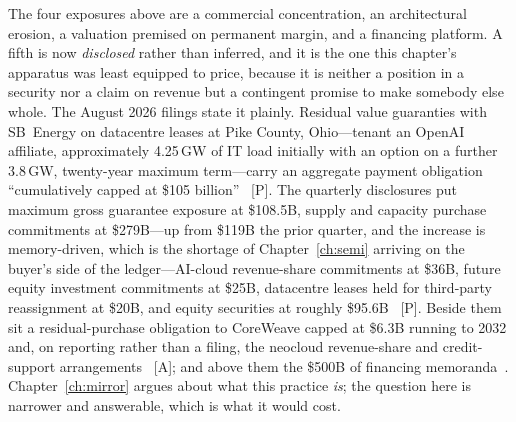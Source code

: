 The four exposures above are a commercial concentration, an architectural erosion, a valuation premised on permanent margin, and a financing platform. A fifth is now \emph{disclosed} rather than inferred, and it is the one this chapter's apparatus was least equipped to price, because it is neither a position in a security nor a claim on revenue but a contingent promise to make somebody else whole. The August 2026 filings state it plainly. Residual value guaranties with SB~Energy on datacentre leases at Pike County, Ohio---tenant an OpenAI affiliate, approximately 4.25\,GW of IT load initially with an option on a further 3.8\,GW, twenty-year maximum term---carry an aggregate payment obligation ``cumulatively capped at \$105 billion''~\cite{nvda-ohio} [P]. The quarterly disclosures put maximum gross guarantee exposure at \$108.5B, supply and capacity purchase commitments at \$279B---up from \$119B the prior quarter, and the increase is memory-driven, which is the shortage of Chapter~\ref{ch:semi} arriving on the buyer's side of the ledger---AI-cloud revenue-share commitments at \$36B, future equity investment commitments at \$25B, datacentre leases held for third-party reassignment at \$20B, and equity securities at roughly \$95.6B~\cite{nvda-exposure} [P]. Beside them sit a residual-purchase obligation to CoreWeave capped at \$6.3B running to 2032 and, on reporting rather than a filing, the neocloud revenue-share and credit-support arrangements~\cite{nvda-backstop} [A]; and above them the \$500B of financing memoranda~\cite{nvda-500b}. Chapter~\ref{ch:mirror} argues about what this practice \emph{is}; the question here is narrower and answerable, which is what it would cost.

